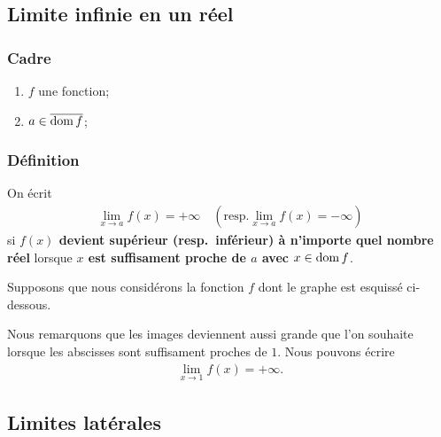 \documentclass[main.tex]{subfiles}
\begin{document}
\subsection{Limite infinie en un réel}

\begin{definition}

    \subsubsection*{Cadre}
    \begin{enumerate}
        \item $f$ une fonction;
        \item $a \in \overline{\operatorname{dom} f}$;
    \end{enumerate}

    \subsubsection*{Définition}
    On écrit
    \begin{align}
        \lim_{x \to a} f(x) = +\infty \quad
        \left(\text{resp.} \lim_{x \to a} f(x) = -\infty\right)
    \end{align}
    si \textbf{$f(x)$ devient supérieur (resp.\ inférieur) à n'importe quel nombre réel}
    lorsque \textbf{$x$ est suffisament proche de $a$ avec $x \in \operatorname{dom} f$}.
\end{definition}

\begin{example}

    Supposons que nous considérons la fonction $f$ dont le graphe est esquissé ci-dessous.

    \begin{center}
        \begin{plot}{0.5}{-6}{-1}{6}{12}
        \end{plot}
    \end{center}

    Nous remarquons que les images deviennent aussi grande que l'on souhaite
    lorsque les abscisses sont suffisament proches de $1$.
    Nous pouvons écrire
    \begin{align}
        \lim_{x \to 1} f(x) = +\infty.
    \end{align}
\end{example}

\subsection{Limites latérales}
\end{document}
